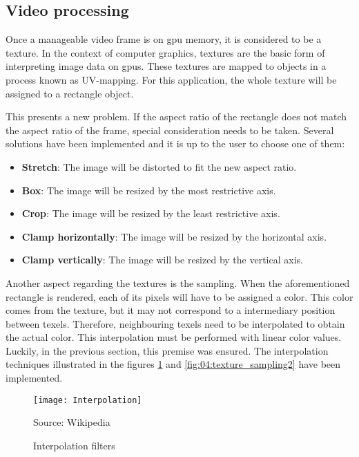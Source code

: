 \documentclass[../main.tex]{subfiles}
\begin{document}
\subsection{Video processing}
Once a manageable video frame is on \gls{gpu} memory, it is considered to be a texture. In the context of computer graphics, textures are the basic form of interpreting image data on \glspl{gpu}. These textures are mapped to objects in a process known as UV-mapping. For this application, the whole texture will be assigned to a rectangle object.\newline

This presents a new problem. If the aspect ratio of the rectangle does not match the aspect ratio of the frame, special consideration needs to be taken. Several solutions have been implemented and it is up to the user to choose one of them:

\begin{itemize}
    \item \textbf{Stretch}: The image will be distorted to fit the new aspect ratio.
    \item \textbf{Box}: The image will be resized by the most restrictive axis. 
    \item \textbf{Crop}: The image will be resized by the least restrictive axis.
    \item \textbf{Clamp horizontally}: The image will be resized by the horizontal axis. 
    \item \textbf{Clamp vertically}: The image will be resized by the vertical axis.
\end{itemize}

Another aspect regarding the textures is the sampling. When the aforementioned rectangle is rendered, each of its \glspl{pixel} will have to be assigned a color. This color comes from the texture, but it may not correspond to a intermediary position between \glspl{texel}. Therefore, neighbouring \glspl{texel} need to be interpolated to obtain the actual color. This interpolation must be performed with linear color values. Luckily, in the previous section, this premise was ensured. The interpolation techniques illustrated in the figures \ref{fig:04:texture_sampling1} and \ref{fig:04:texture_sampling2} have been implemented.\newline

\begin{figure}[htbp]
    \centering
    \texttt{[image: Interpolation]}
    
    Source: Wikipedia
    \caption{Interpolation filters}
    \label{fig:04:texture_sampling1}
\end{figure}
\end{document}
